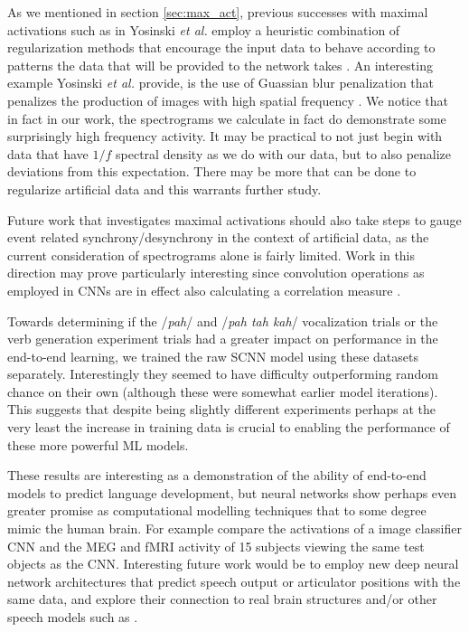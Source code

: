 \documentclass[utf8]{frontiersSCNS} %
\begin{document}
As we mentioned in section \ref{sec:max_act}, previous successes with maximal activations such as in Yosinski {\em et al.} employ a heuristic combination of regularization methods that encourage the input data to behave according to patterns the data that will be provided to the network takes \cite{Yosinski2015}. An interesting example Yosinski {\em et al.} provide, is the use of Guassian blur penalization that penalizes the production of images with high spatial frequency \cite{Yosinski2015}. We notice that in fact in our work, the spectrograms we calculate in fact do demonstrate some surprisingly high frequency activity. It may be practical to not just begin with data that have $1/f$ spectral density as we do with our data, but to also penalize deviations from this expectation. There may be more that can be done to regularize artificial data and this warrants further study.

Future work that investigates maximal activations should also take steps to gauge event related synchrony/desynchrony in the context of artificial data, as the current consideration of spectrograms alone is fairly limited. Work in this direction may prove particularly interesting since convolution operations as employed in CNNs are in effect also calculating a correlation measure \cite{GravesRNNBook}.

Towards determining if the /{\em pah}/ and /{\em pah tah kah}/ vocalization trials or the verb generation experiment trials had a greater impact on performance in the end-to-end learning, we trained the raw SCNN model using these datasets separately. Interestingly they seemed to have difficulty outperforming random chance on their own (although these were somewhat earlier model iterations). This suggests that despite being slightly different experiments perhaps at the very least the increase in training data is crucial to enabling the performance of these more powerful ML models.

These results are interesting as a demonstration of the ability of end-to-end models to predict language development, but neural networks show perhaps even greater promise as computational modelling techniques that to some degree mimic the human brain. For example \cite{cichy2016} compare the activations of a image classifier CNN and the MEG and fMRI activity of 15 subjects viewing the same test objects as the CNN. Interesting future work would be to employ new deep neural network architectures that predict speech output or articulator positions with the same data, and explore their connection to real brain structures and/or other speech models such as \cite{Guenther2005}.
\end{document}
